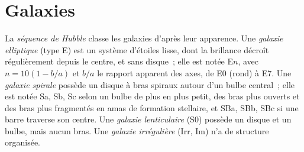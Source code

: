 \section{Galaxies}\label{sec:b3:milky-way-galaxies:galaxies}

\begin{definition}\label{def:b3:milky-way-galaxies:types}
La \emph{séquence de Hubble} classe les galaxies d'après
leur apparence. Une \emph{galaxie elliptique}
(type E) est un système d'étoiles lisse, dont la brillance décroît régulièrement
depuis le centre, et sans disque~; elle est notée E$n$, avec $n = 10(1 - b/a)$
et $b/a$ le rapport apparent des axes, de E0 (rond) à E7. Une
\emph{galaxie spirale} possède un disque à bras spiraux
autour d'un bulbe central~; elle est notée Sa, Sb, Sc selon un bulbe
de plus en plus petit, des bras plus ouverts et des bras plus fragmentés en amas de formation stellaire, et
SBa, SBb, SBc si une barre traverse son centre. Une \emph{galaxie
lenticulaire} (S0) possède un disque et un bulbe, mais aucun
bras. Une \emph{galaxie irrégulière} (Irr, Im) n'a
de structure organisée.
\end{definition}

